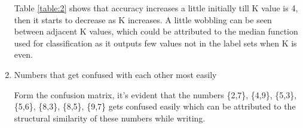 \documentclass{article}
\begin{document}
\begin{enumerate}
Table \ref{table:2} shows that accuracy increases a little initially till K value is 4, then it starts to decrease 
as K increases. A little wobbling can be seen between adjacent K values, which could be attributed to the median function used for classification as it outputs few values not in the label sets when K is even.

\item
Numbers that get confused with each other most easily

Form the confusion matrix, it's evident that the numbers \{2,7\}, \{4,9\}, \{5,3\}, \{5,6\}, \{8,3\}, \{8,5\}, \{9,7\} gets confused easily which can be attributed to the structural similarity of these numbers while writing. 
\end{enumerate}
	
\end{document}
